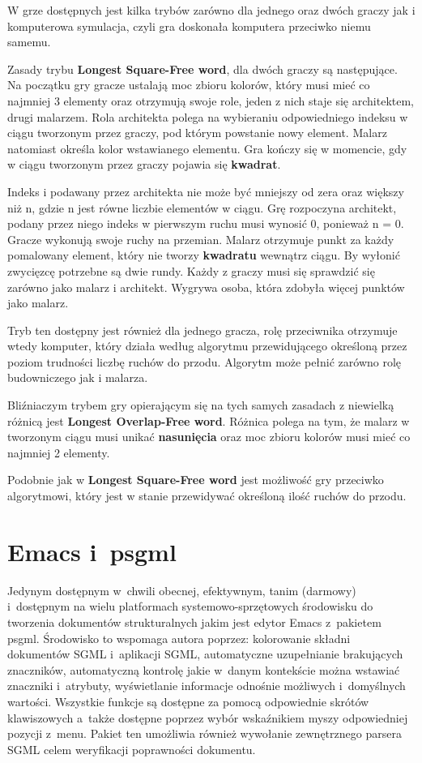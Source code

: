 \documentclass[document]{xmgr}
\begin{document}
W grze dostępnych jest kilka trybów zarówno dla jednego oraz dwóch graczy jak i komputerowa symulacja, czyli gra doskonała komputera przeciwko niemu samemu.

Zasady trybu \textbf{Longest Square-Free word}, dla dwóch graczy są następujące.
Na początku gry gracze ustalają moc zbioru kolorów, który musi mieć co najmniej 3 elementy oraz otrzymują swoje role, jeden z nich staje się architektem, drugi malarzem. Rola architekta polega na wybieraniu odpowiedniego indeksu w ciągu tworzonym przez graczy, pod którym powstanie nowy element. Malarz natomiast określa kolor wstawianego elementu. Gra kończy się w momencie, gdy w ciągu tworzonym przez graczy pojawia się \textbf{kwadrat}. 

Indeks i  podawany przez architekta nie może być mniejszy od zera oraz większy niż n, gdzie n jest równe liczbie elementów w ciągu.
Grę rozpoczyna architekt, podany przez niego indeks w pierwszym ruchu musi wynosić 0, ponieważ n = 0. Gracze wykonują swoje ruchy na przemian. Malarz otrzymuje punkt za każdy pomalowany element, który nie tworzy \textbf{kwadratu} wewnątrz ciągu.
By wyłonić zwycięzcę potrzebne są dwie rundy. Każdy z graczy musi się sprawdzić się zarówno jako malarz i architekt. Wygrywa osoba, która zdobyła więcej punktów jako malarz.

Tryb ten dostępny jest również dla jednego gracza, rolę przeciwnika otrzymuje wtedy komputer, który działa według algorytmu przewidującego określoną przez poziom trudności liczbę ruchów do przodu. Algorytm może pełnić zarówno rolę budowniczego jak i malarza.

Bliźniaczym trybem gry opierającym się na tych samych zasadach z niewielką różnicą jest \textbf{Longest Overlap-Free word}. 
Różnica polega na tym, że malarz w tworzonym ciągu musi unikać \textbf{nasunięcia} oraz moc zbioru kolorów musi mieć co najmniej 2 elementy.

Podobnie jak w \textbf{Longest Square-Free word} jest możliwość gry przeciwko algorytmowi, który jest w stanie przewidywać określoną ilość ruchów do przodu.

\section{Emacs i~psgml}

Jedynym dostępnym w~chwili
obecnej, efektywnym, tanim (darmowy) i~dostępnym na wielu
platformach systemowo-sprzętowych środowisku do tworzenia dokumentów
strukturalnych jakim jest edytor Emacs z~pakietem
psgml. Środowisko to wspomaga autora poprzez:
kolorowanie składni dokumentów SGML i~aplikacji SGML, automatyczne
uzupełnianie brakujących znaczników, automatyczną kontrolę jakie
w~danym kontekście można wstawiać znaczniki i~atrybuty, wyświetlanie
informacje odnośnie możliwych i~domyślnych wartości.
Wszystkie funkcje są dostępne za pomocą
odpowiednie skrótów klawiszowych a~także dostępne poprzez wybór
wskaźnikiem myszy odpowiedniej pozycji z~menu. Pakiet ten umożliwia
również wywołanie zewnętrznego parsera SGML celem
weryfikacji poprawności dokumentu.
\end{document}
